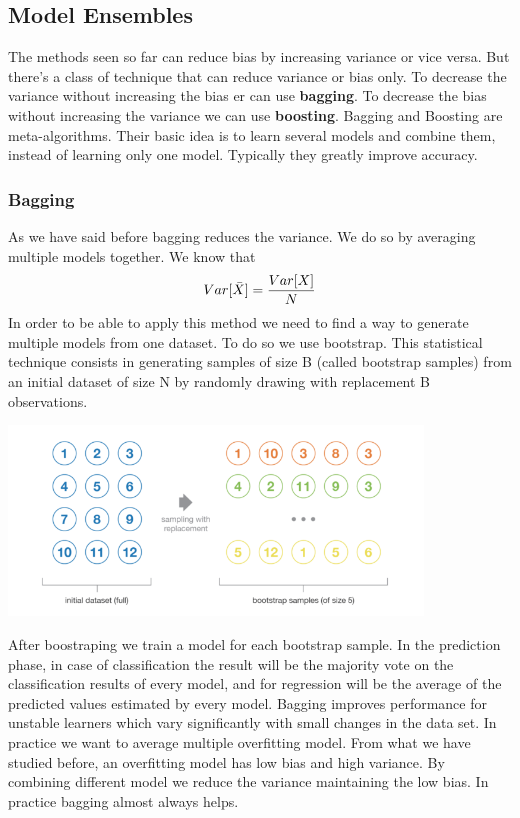 \documentclass[main.tex]{subfiles}
\begin{document}
\subsection{Model Ensembles}
The methods seen so far can reduce bias by increasing variance or vice versa. But there's a class of technique that can reduce variance or bias only.
To decrease the variance without increasing the bias er can use \textbf{bagging}.
To decrease the bias without increasing the variance we can use \textbf{boosting}.
Bagging and Boosting are meta-algorithms. Their basic idea is to learn several models and combine them, instead of learning only one model. Typically they greatly improve accuracy.

\subsubsection{Bagging}
As we have said before bagging reduces the variance. We do so by averaging multiple models together. We know that
\begin{equation}
    Var[\Bar{X}] = \frac{Var[X]}{N}
\end{equation}
In order to be able to apply this method we need to find a way to generate multiple models from one dataset. To do so we use bootstrap.
This statistical technique consists in generating samples of size B (called bootstrap samples) from an initial dataset of size N by randomly drawing with replacement B observations.
\begin{center}
    \includegraphics[width=110mm]{img/bootstrap.png}
\end{center}
After boostraping we train a model for each bootstrap sample. In the prediction phase, in case of classification the result will be the majority vote on the classification results of every model, and for regression will be the average of the predicted values estimated by every model. Bagging improves performance for unstable learners which vary significantly with small changes in the data set. In practice we want to average multiple overfitting model. From what we have studied before, an overfitting model has low bias and high variance. By combining different model we reduce the variance maintaining the low bias. In practice bagging almost always helps. 
\end{document}

